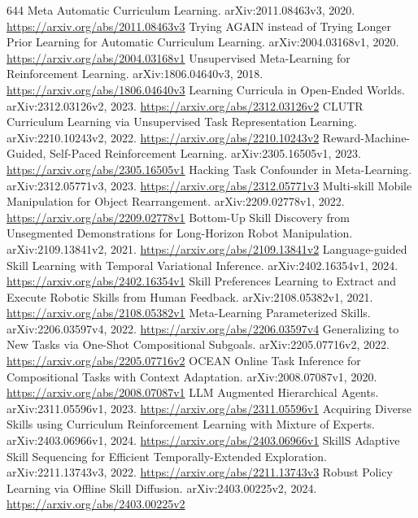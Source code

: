 \documentclass[11pt]{article}
\begin{document}
\begin{thebibliography}{644}
 Meta Automatic Curriculum Learning. arXiv:2011.08463v3, 2020. \url{https://arxiv.org/abs/2011.08463v3}
 Trying AGAIN instead of Trying Longer Prior Learning for Automatic Curriculum Learning. arXiv:2004.03168v1, 2020. \url{https://arxiv.org/abs/2004.03168v1}
 Unsupervised Meta-Learning for Reinforcement Learning. arXiv:1806.04640v3, 2018. \url{https://arxiv.org/abs/1806.04640v3}
 Learning Curricula in Open-Ended Worlds. arXiv:2312.03126v2, 2023. \url{https://arxiv.org/abs/2312.03126v2}
 CLUTR Curriculum Learning via Unsupervised Task Representation Learning. arXiv:2210.10243v2, 2022. \url{https://arxiv.org/abs/2210.10243v2}
 Reward-Machine-Guided, Self-Paced Reinforcement Learning. arXiv:2305.16505v1, 2023. \url{https://arxiv.org/abs/2305.16505v1}
 Hacking Task Confounder in Meta-Learning. arXiv:2312.05771v3, 2023. \url{https://arxiv.org/abs/2312.05771v3}
 Multi-skill Mobile Manipulation for Object Rearrangement. arXiv:2209.02778v1, 2022. \url{https://arxiv.org/abs/2209.02778v1}
 Bottom-Up Skill Discovery from Unsegmented Demonstrations for Long-Horizon Robot Manipulation. arXiv:2109.13841v2, 2021. \url{https://arxiv.org/abs/2109.13841v2}
 Language-guided Skill Learning with Temporal Variational Inference. arXiv:2402.16354v1, 2024. \url{https://arxiv.org/abs/2402.16354v1}
 Skill Preferences Learning to Extract and Execute Robotic Skills from Human Feedback. arXiv:2108.05382v1, 2021. \url{https://arxiv.org/abs/2108.05382v1}
 Meta-Learning Parameterized Skills. arXiv:2206.03597v4, 2022. \url{https://arxiv.org/abs/2206.03597v4}
 Generalizing to New Tasks via One-Shot Compositional Subgoals. arXiv:2205.07716v2, 2022. \url{https://arxiv.org/abs/2205.07716v2}
 OCEAN Online Task Inference for Compositional Tasks with Context Adaptation. arXiv:2008.07087v1, 2020. \url{https://arxiv.org/abs/2008.07087v1}
 LLM Augmented Hierarchical Agents. arXiv:2311.05596v1, 2023. \url{https://arxiv.org/abs/2311.05596v1}
 Acquiring Diverse Skills using Curriculum Reinforcement Learning with Mixture of Experts. arXiv:2403.06966v1, 2024. \url{https://arxiv.org/abs/2403.06966v1}
 SkillS Adaptive Skill Sequencing for Efficient Temporally-Extended Exploration. arXiv:2211.13743v3, 2022. \url{https://arxiv.org/abs/2211.13743v3}
 Robust Policy Learning via Offline Skill Diffusion. arXiv:2403.00225v2, 2024. \url{https://arxiv.org/abs/2403.00225v2}

\end{thebibliography}
\end{document}
